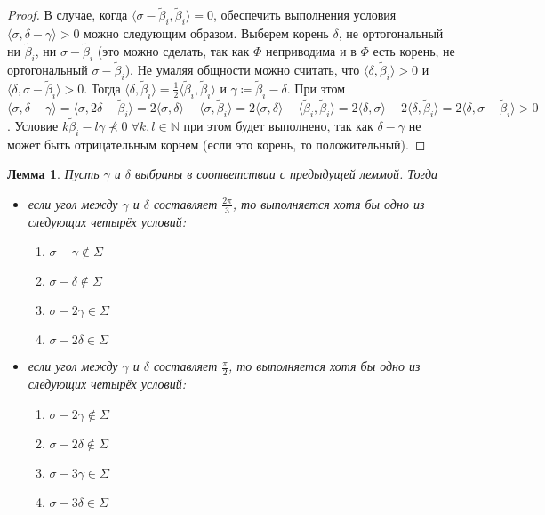 \documentclass[12pt]{matmex-diploma}
\theoremstyle{mystyleni}
\theoremstyle{mystyle}
\newtheorem{lm}{Лемма}
\newcommand{\N}{\mathbb{N}}
\begin{document}
\begin{proof}
В случае, когда $\langle\sigma-\widetilde\beta_i,\widetilde\beta_i\rangle=0$, обеспечить выполнения условия $\langle\sigma,\delta-\gamma\rangle>0$ можно следующим образом. Выберем корень $\delta$, не ортогональный ни $\widetilde\beta_i$, ни $\sigma-\widetilde\beta_i$ (это можно сделать, так как $\Phi$ неприводима и в $\Phi$ есть корень, не ортогональный $\sigma-\widetilde\beta_i$). Не умаляя общности можно считать, что $\langle\delta,\widetilde\beta_i\rangle>0$ и $\langle\delta,\sigma-\widetilde\beta_i\rangle>0$. Тогда $\langle\delta,\widetilde\beta_i\rangle=\frac{1}{2}\langle\widetilde\beta_i,\widetilde\beta_i\rangle$ и $\gamma\coloneqq\widetilde\beta_i-\delta$. При этом
$\langle\sigma,\delta-\gamma\rangle =
\langle\sigma,2\delta-\widetilde\beta_i\rangle =
2\langle\sigma,\delta\rangle-\langle\sigma,\widetilde\beta_i\rangle = 
2\langle\sigma,\delta\rangle-\langle\widetilde\beta_i,\widetilde\beta_i\rangle =
2\langle\delta,\sigma\rangle-2\langle\delta,\widetilde\beta_i\rangle =
2\langle\delta,\sigma-\widetilde\beta_i\rangle > 0$.
Условие $k\widetilde\beta_i-l\gamma\nprec 0\;\forall k,l\in\N$ при этом будет выполнено, так как  $\delta-\gamma$ не может быть отрицательным корнем (если это корень, то положительный).
\end{proof}

\begin{lm}\label{highestweightvariants}
Пусть $\gamma$ и $\delta$ выбраны в соответствии с предыдущей леммой. Тогда
\begin{itemize}[label={\LARGE\raisebox{-0.4ex}{\textbullet}\;},leftmargin=2\parindent]
\item если угол между $\gamma$ и $\delta$ составляет $\frac{2\pi}{3}$, то выполняется хотя бы одно из следующих четырёх условий:
\begin{enumerate}
\item $ \sigma - \gamma \notin \Sigma$
\item $ \sigma - \delta \notin \Sigma$
\item $ \sigma - 2\gamma \in \Sigma$
\item $ \sigma - 2\delta \in \Sigma$
\end{enumerate}
\item если угол между $\gamma$ и $\delta$ составляет $\frac{\pi}{2}$, то выполняется хотя бы одно из следующих четырёх условий:
\begin{enumerate}
\item $ \sigma - 2\gamma \notin \Sigma$
\item $ \sigma - 2\delta \notin \Sigma$
\item $ \sigma - 3\gamma \in \Sigma$
\item $ \sigma - 3\delta \in \Sigma$
\end{enumerate}
\end{itemize}
\end{lm}
\end{document}
